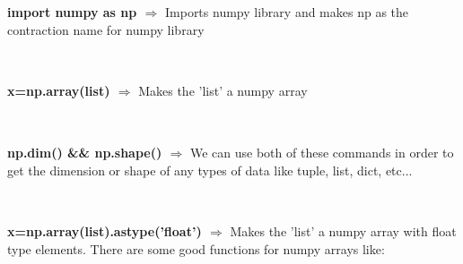 \documentclass[a4paper,18pt]{article}
\begin{document}

\newpage

\section{\colorbox {Abi}{}}
\subsection{\colorbox {matgreen}{\color{white}{\large import numpy as np}}}
\textbf{import numpy as np $\Rightarrow$} Imports numpy library and makes np as the contraction name for numpy library\\\\


\subsection{\colorbox {matgreen}{\color{white}{\large np.array(list)}}}
\textbf{x=np.array(list) $\Rightarrow$} Makes the 'list' a numpy array\\\\


\subsection{\colorbox {matgreen}{\color{white}{\large Dimension and Shape}}}
\textbf{np.dim() \&\& np.shape() $\Rightarrow$} We can use both of these commands in order to get the dimension or shape of any types of data like tuple, list, dict, etc...\\\\


\subsection{\colorbox {matgreen}{\color{white}{\large np.array(list).astype('float')}}}
\textbf{x=np.array(list).astype('float') $\Rightarrow$} Makes the 'list' a numpy array with float type elements. There are some good functions for numpy arrays like:\\\\
\end{document}
